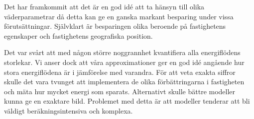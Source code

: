 Det har framkommit att det är en god idé att ta hänsyn till olika väderparametrar då
detta kan ge en ganska markant besparing under vissa förutsättningar. Självklart är
besparingen olika beroende på fastighetens egenskaper och fastighetens geografiska position.

Det var svårt att med någon större noggrannhet kvantifiera alla energiflödens storlekar. Vi
anser dock att våra approximationer ger en god idé angående hur stora energiflödena är i jämförelse
med varandra. För att veta exakta siffror skulle det vara tvunget att implementera de olika
förbättringarna i fastigheten och mäta hur mycket energi som sparats. Alternativt skulle
bättre modeller kunna ge en exaktare bild. Problemet med detta är att modeller tenderar att
bli väldigt beräkningsintensiva och komplexa.

